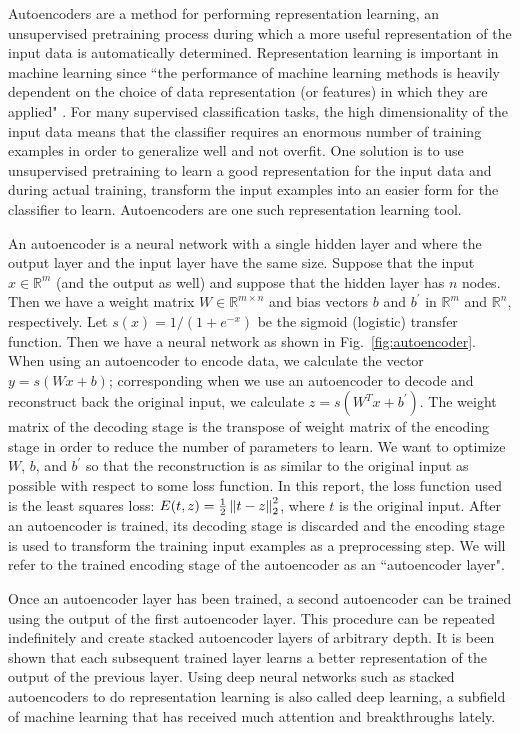 Autoencoders are a method for performing representation learning, an unsupervised pretraining process during which a more useful representation of the
input data is automatically determined. Representation learning is important in machine learning since ``the performance of 
machine learning methods is heavily dependent on the choice of data representation (or features) in which they are applied" 
\cite{bengio2012rep}. For many supervised classification tasks, the high dimensionality of the input data means that the classifier requires an enormous number of training examples in order to generalize well and not overfit. One solution is to use unsupervised pretraining to learn a good representation for the input data and during actual training, transform the input examples into an easier form for the classifier to learn. Autoencoders are one such representation learning tool.

An autoencoder is a neural network with a single hidden layer and where the output layer and the input layer have the same size. Suppose that the input $x\in\mathbb{R}^m$ (and the output as well) and suppose that the hidden layer has $n$ nodes. Then we have a weight matrix $W\in\mathbb{R}^{m\times n}$ and bias vectors $b$ and $b^{'}$ in $\mathbb{R}^m$ and $\mathbb{R}^n$, respectively. Let $s(x) = 1/(1+e^{-x})$ be the sigmoid (logistic) transfer function. Then we have a neural network as shown in Fig.~\ref{fig:autoencoder}. When using an autoencoder to encode data, we calculate the vector $y=s(Wx + b)$; corresponding when we use an autoencoder to decode and reconstruct back the original input, we calculate $z=s(W^{T}x+b^{'})$. The weight matrix of the decoding stage is the transpose of weight matrix of the encoding stage in order to reduce the number of parameters to learn. We want to optimize $W$, $b$, and $b^{'}$ so that the reconstruction is as similar to the original input as possible with respect to some loss function. In this report, the loss function used is the least squares loss: $E(t,z)=\frac{1}{2}\left\lVert t-z \right\rVert_2^2$, where $t$ is the original input. After an autoencoder is trained, its decoding stage is discarded and the encoding stage is used to transform the training input examples as a preprocessing step. We will refer to the trained encoding stage of the autoencoder as an ``autoencoder layer".

Once an autoencoder layer has been trained, a second autoencoder can be trained using the output of the first autoencoder layer. This procedure can be repeated indefinitely and create stacked autoencoder layers of arbitrary depth. It is been shown that each subsequent trained layer learns a better representation of the output of the previous layer. Using deep neural networks such as stacked autoencoders to do representation learning is also called deep learning, a subfield of machine learning that has received much attention and breakthroughs lately. 

